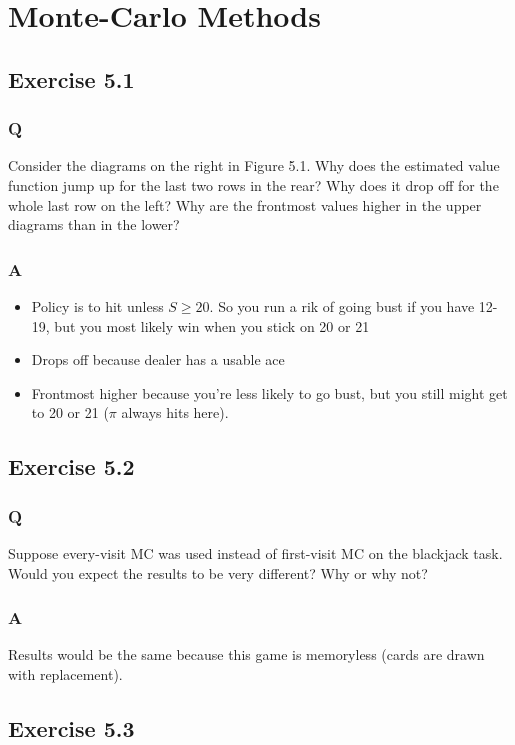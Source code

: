 \section{Monte-Carlo Methods}
\subsection{Exercise 5.1}
\subsubsection{Q}
Consider the diagrams on the right in Figure 5.1. Why does the estimated value function jump up for the last two rows in the rear? Why does it drop off for the whole last row on the left? Why are the frontmost values higher in the upper diagrams than in the lower?

\subsubsection{A}
\begin{itemize}
    \item Policy is to hit unless $S \geq 20$. So you run a rik of going bust if you have 12-19, but you most likely win when you stick on 20 or 21
    \item Drops off because dealer has a usable ace
    \item Frontmost higher because you're less likely to go bust, but you still might get to 20 or 21 ($\pi$ always hits here).
\end{itemize}

\subsection{Exercise 5.2}
\subsubsection{Q}
Suppose every-visit MC was used instead of first-visit MC on the blackjack task. Would you expect the results to be very different? Why or why not?

\subsubsection{A}
Results would be the same because this game is memoryless (cards are drawn with replacement).

\subsection{Exercise 5.3}
